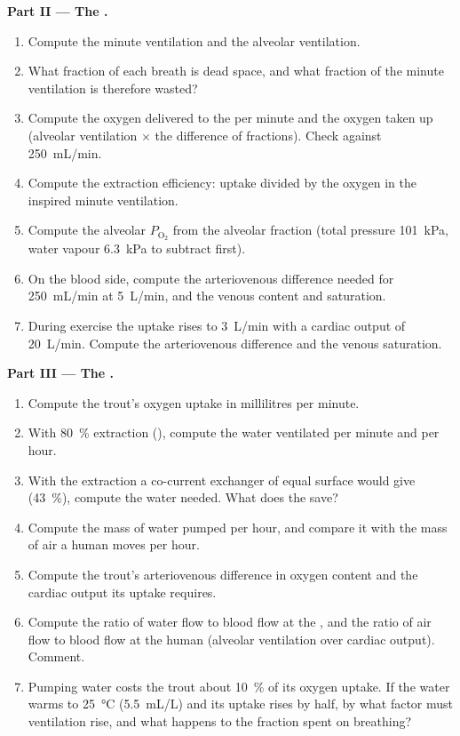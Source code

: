 \begin{problem}
\medskip
\noindent\textbf{Part II --- The .}
\begin{enumerate}[resume]
  \item Compute the minute ventilation and the alveolar ventilation.
  \item What fraction of each breath is dead space, and what fraction
        of the minute ventilation is therefore wasted?
  \item Compute the oxygen delivered to the  per minute and
        the oxygen taken up (alveolar ventilation $\times$ the
        difference of fractions). Check against \qty{250}{mL/min}.
  \item Compute the extraction efficiency: uptake divided by the
        oxygen in the inspired minute ventilation.
  \item Compute the alveolar $P_{\mathrm{O_2}}$ from the alveolar
        fraction (total pressure \qty{101}{kPa}, water vapour
        \qty{6.3}{kPa} to subtract first).
  \item On the blood side, compute the arteriovenous difference
        needed for \qty{250}{mL/min} at \qty{5}{L/min}, and the venous
        content and saturation.
  \item During exercise the uptake rises to \qty{3}{L/min} with a
        cardiac output of \qty{20}{L/min}. Compute the arteriovenous
        difference and the venous saturation.
\end{enumerate}

\medskip
\noindent\textbf{Part III --- The .}
\begin{enumerate}[resume]
  \item Compute the trout's oxygen uptake in millilitres per minute.
  \item With \qty{80}{\%} extraction (), compute the
        water ventilated per minute and per hour.
  \item With the extraction a co-current exchanger of equal surface
        would give (\qty{43}{\%}), compute the water needed. What
        does the  save?
  \item Compute the mass of water pumped per hour, and compare it with
        the mass of air a human moves per hour.
  \item Compute the trout's arteriovenous difference in oxygen content
        and the cardiac output its uptake requires.
  \item Compute the ratio of water flow to blood flow at the , and
        the ratio of air flow to blood flow at the human 
        (alveolar ventilation over cardiac output). Comment.
  \item Pumping water costs the trout about \qty{10}{\%} of its
        oxygen uptake. If the water warms to \qty{25}{\celsius}
        (\qty{5.5}{mL/L}) and its uptake rises by half, by what factor
        must ventilation rise, and what happens to the fraction spent
        on breathing?
\end{enumerate}


\end{problem}

